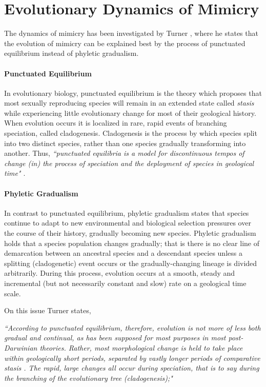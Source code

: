 \section{Evolutionary Dynamics of Mimicry}
\label{sec:evolutionary-dynamics-of-mimicry}
The dynamics of mimicry has been investigated by Turner \cite{turner1988}, where he states that the evolution of mimicry can be explained best by the process of punctuated equilibrium instead of phyletic gradualism. 

\paragraph{Punctuated Equilibrium}
In evolutionary biology, punctuated equilibrium is the theory which proposes that most sexually reproducing species will remain in an extended state called \textit{stasis} while experiencing little evolutionary change for most of their geological history. When evolution occurs it is localized in rare, rapid events of branching speciation, called cladogenesis. Cladogenesis is the process by which species split into two distinct species, rather than one species gradually transforming into another. Thus, \textsl{``punctuated equilibria is a model for discontinuous tempos of change (in) the process of speciation and the deployment of species in geological time" \cite{gould1977}}. 

\paragraph{Phyletic Gradualism}
In contrast to punctuated equilibrium, phyletic gradualism states that species continue to adapt to new environmental and biological selection pressures over the course of their history, gradually becoming new species. Phyletic gradualism holds that a species population changes gradually; that is there is no clear line of demarcation between an ancestral species and a descendant species unless a splitting (cladogenetic) event occurs or the gradually-changing lineage is divided arbitrarily. During this process, evolution occurs at a smooth, steady and incremental (but not necessarily constant and slow) rate on a geological time scale. 

On this issue Turner states,

\textsl{``According to punctuated equilibrium, therefore, evolution is not more of less both gradual and continual, as has been supposed for most purposes in most post-Darwinian theories. Rather, most morphological change is held to take place within geologically short periods, separated by vastly longer periods of comparative stasis \cite{eldredge1972}. The rapid, large changes all occur during speciation, that is to say during the branching of the evolutionary tree (cladogenesis);" \cite{turner1988}}

